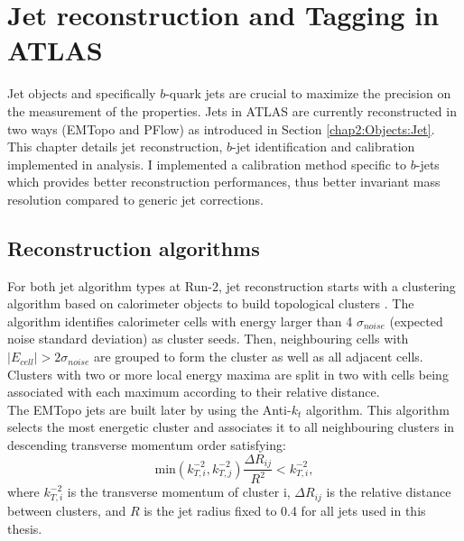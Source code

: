 \newpage
\chapter{Jet reconstruction and Tagging in ATLAS}
\label{Jet}
Jet objects and specifically $b$-quark jets are crucial to maximize the precision on the measurement of the \HHyybb properties. Jets in ATLAS are currently reconstructed in two ways (EMTopo and PFlow) as introduced in Section \ref{chap2:Objects:Jet}. This chapter details jet reconstruction, $b$-jet identification and calibration implemented in \HHyybb analysis. I implemented a calibration method specific to $b$-jets which provides better reconstruction performances, thus better \mbb invariant mass resolution compared to generic jet corrections.

\section{Reconstruction algorithms}
\label{Jet:JR}
For both jet algorithm types at Run-2, jet reconstruction starts with a clustering algorithm based on calorimeter objects to build topological clusters \cite{Jet_Algo_Perf}. The algorithm identifies calorimeter cells with energy larger than 4 $\sigma_{noise}$ (expected noise standard deviation) as cluster seeds. Then, neighbouring cells with $|E_{cell}| > 2\sigma_{noise}$ are grouped to form the cluster as well as all adjacent cells. Clusters with two or more local energy maxima are split in two with cells being associated with each maximum according to their relative distance. \\
The EMTopo jets are built later by using the Anti-$k_t$ algorithm. This algorithm selects the most energetic cluster and associates it to all neighbouring clusters in descending transverse momentum order satisfying:
\begin{equation}
    \text{min}(k_{T,i}^{-2}, k_{T,j}^{-2}) \frac{\Delta R_{ij}}{R^2} < k_{T,i}^{-2},
\end{equation}
where $k_{T,i}^{-2}$ is the transverse momentum of cluster i, $\Delta R_{ij}$ is the relative distance between clusters, and $R$ is the jet radius fixed to 0.4 for all jets used in this thesis. \\
